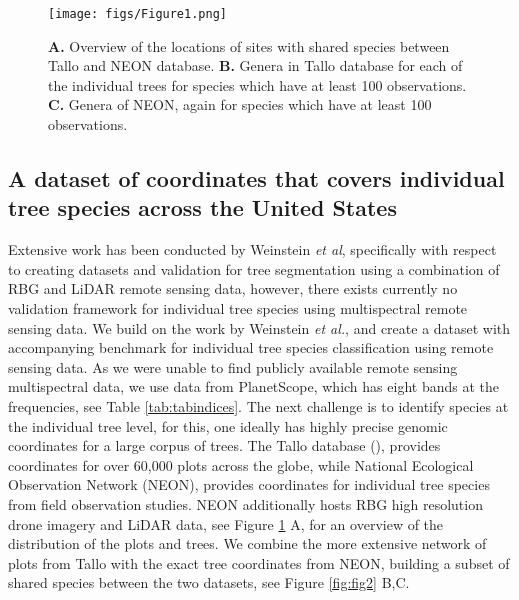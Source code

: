 \documentclass[9pt,lineno]{elife}
\begin{document}


\begin{figure}
\begin{fullwidth}
\begin{center}
\texttt{[image: figs/Figure1.png]}
\caption{
        \textbf{A.} Overview of the locations of sites with shared species between Tallo and NEON database.
        \textbf{B.} Genera in Tallo database for each of the individual trees for species which have at least 100 observations.
        \textbf{C.} Genera of NEON, again for species which have at least 100 observations.
}
\end{center}
\label{fig:data}
\end{fullwidth}
\end{figure}


\subsection{A dataset of coordinates that covers individual tree species across the United States}
Extensive work has been conducted by Weinstein \textit{et al}, specifically with respect to creating datasets and validation for tree segmentation using a combination of RBG and LiDAR remote sensing data, however, there exists currently no validation framework for individual tree species using multispectral remote sensing data. We build on the work by Weinstein \textit{et al.}, and create a dataset with accompanying benchmark for individual tree species classification using remote sensing data. As we were unable to find publicly available remote sensing multispectral data, we use data from PlanetScope, which has eight bands at the frequencies, see Table \ref{tab:tabindices}. The next challenge is to identify species at the individual tree level, for this, one ideally has highly precise genomic coordinates for a large corpus of trees. The Tallo database (\cite{Jucker_Loubota_2022}), provides coordinates for over 60,000 plots across the globe, while National Ecological Observation Network (NEON), provides coordinates for individual tree species from field observation studies. NEON additionally hosts RBG high resolution drone imagery and LiDAR data, see Figure \ref{fig:data} A, for an overview of the distribution of the plots and trees. We combine the more extensive network of plots from Tallo with the exact tree coordinates from NEON, building a subset of shared species between the two datasets, see Figure \ref{fig:fig2} B,C.
\end{document}
